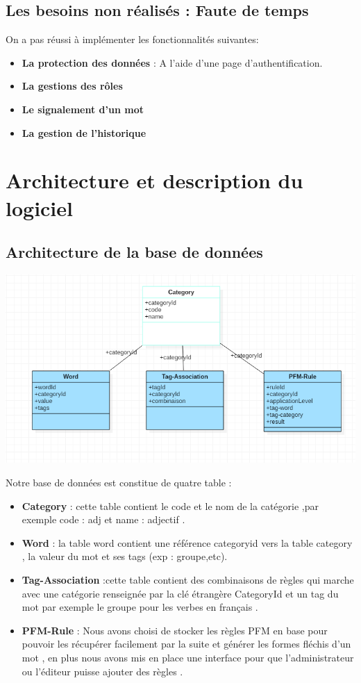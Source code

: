 \documentclass[12pt,a4paper]{article}
\begin{document}
\subsection{Les besoins non réalisés : Faute de temps}

On a pas réussi à implémenter les  fonctionnalités suivantes:

\begin{itemize}
\item \textbf{La protection des données } : A l'aide d'une page d'authentification.
\item \textbf{La gestions des rôles }
\item \textbf{Le signalement d'un mot}
\item \textbf{La gestion de l'historique}
\end{itemize}


\section{Architecture et description du logiciel}
\subsection{Architecture de la base de données }



\includegraphics{img/basefinal.PNG}



\newpage
Notre base de données est constitue de quatre table : 
\begin{itemize}
\item \textbf{Category} : cette table contient le code et le nom de la catégorie ,par exemple code : adj et name : adjectif .
\item \textbf{Word} : la table word contient une référence categoryid vers la table category , la valeur du mot et ses tags (exp : groupe,etc).
\item \textbf{Tag-Association} :cette table contient des combinaisons de règles qui marche avec une catégorie renseignée par la clé étrangère CategoryId  et un tag du mot par exemple le groupe pour les verbes en français .
\item \textbf{PFM-Rule} : Nous avons choisi de stocker les règles PFM en base pour pouvoir les récupérer facilement par la suite et générer les formes fléchis d'un mot , en plus nous avons mis en place une interface pour que l'administrateur ou l'éditeur puisse ajouter des règles .

\end{itemize}
\end{document}
